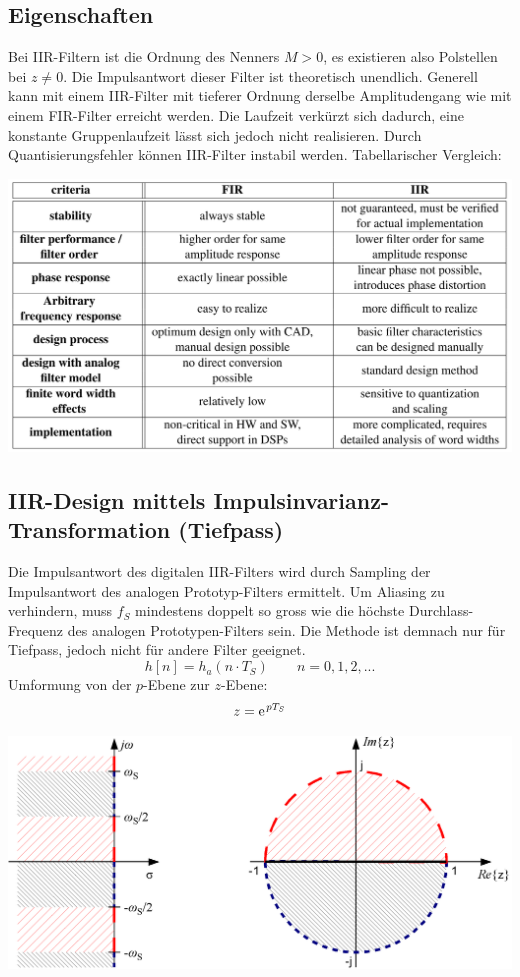 \subsection{Eigenschaften}
Bei IIR-Filtern ist die Ordnung des Nenners $M>0$, es existieren also Polstellen bei 
$z\neq0$. Die Impulsantwort dieser Filter ist theoretisch unendlich. Generell kann mit 
einem IIR-Filter mit tieferer Ordnung derselbe Amplitudengang wie mit einem FIR-Filter 
erreicht werden. Die Laufzeit verkürzt sich dadurch, eine konstante Gruppenlaufzeit 
lässt sich jedoch nicht realisieren. Durch Quantisierungsfehler können IIR-Filter instabil 
werden. Tabellarischer Vergleich:
\begin{center}
	\includegraphics[width=.8\textwidth]{../fig/fir_vs_iir}
\end{center}
\subsection{IIR-Design mittels Impulsinvarianz-Transformation (Tiefpass)}
Die Impulsantwort des digitalen IIR-Filters wird durch Sampling der Impulsantwort des
analogen Prototyp-Filters ermittelt. Um Aliasing zu verhindern, muss $f_S$ mindestens doppelt so gross wie die höchste 
Durchlass-Frequenz des analogen Prototypen-Filters sein. Die Methode ist demnach nur 
für Tiefpass, jedoch nicht für andere Filter geeignet.
\[ h[n] = h_a(n \cdot T_S) \qquad n=0,1,2,... \]
Umformung von der $p$-Ebene zur $z$-Ebene:
\[ z = \e^{pT_S} \]
\begin{center}
	\includegraphics[width=.7\textwidth]{../fig/mapping_p_to_z_plane}
\end{center}
\newpage

